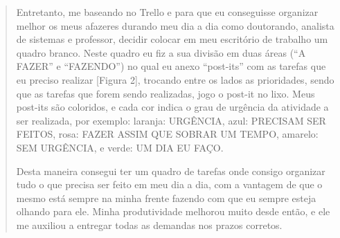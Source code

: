 \begin{quote}
Entretanto, me baseando no Trello e para que eu conseguisse organizar melhor os meus afazeres durando meu dia a dia como doutorando, analista de sistemas e professor, decidir colocar em meu escritório de trabalho um quadro branco. Neste quadro eu fiz a sua divisão em duas áreas (“A FAZER” e “FAZENDO”) no qual eu anexo “post-its” com as tarefas que eu preciso realizar [Figura 2], trocando entre os lados as prioridades, sendo que as tarefas que forem sendo realizadas, jogo o post-it no lixo. Meus post-its são coloridos, e cada cor indica o grau de urgência da atividade a ser realizada, por exemplo: laranja: URGÊNCIA, azul: PRECISAM SER FEITOS, rosa: FAZER ASSIM QUE SOBRAR UM TEMPO, amarelo: SEM URGÊNCIA, e verde: UM DIA EU FAÇO.

Desta maneira consegui ter um quadro de tarefas onde consigo organizar tudo o que precisa ser feito em meu dia a dia, com a vantagem de que o mesmo está sempre na minha frente fazendo com que eu sempre esteja olhando para ele. Minha produtividade melhorou muito desde então, e ele me auxiliou a entregar todas as demandas nos prazos corretos.

\end{quote}
